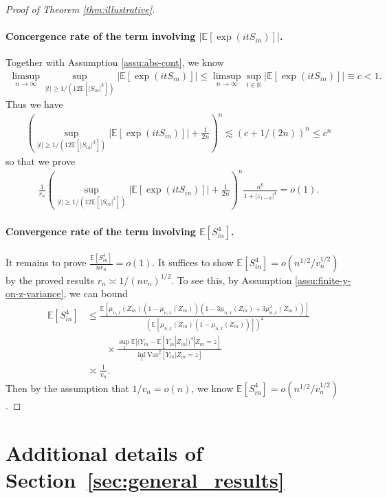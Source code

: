 \documentclass[12pt]{article}
\theoremstyle{definition}
\newcommand{\E}{\mathbb E}								%
\newcommand{\srz}{Z}									%
\newcommand{\sry}{Y}									%
\begin{document}
\begin{proof}[Proof of Theorem \ref{thm:illustrative}]
  \paragraph{Concergence rate of the term involving $|\E[\exp(itS_{in})]|$.} 
  Together with Assumption \ref{assu:abs-cont}, we know
  \begin{align*}
	\limsup_{n\rightarrow\infty}\sup_{|t|\geq 1/ (12\E[|S_{in}|^3])}|\E[\exp(itS_{in})]|\leq \limsup_{n\rightarrow\infty}\sup_{t\in\mathbb{R}}  |\E[\exp(itS_{in})]|\equiv c<1.
  \end{align*} 
  Thus we have 
  \begin{align*}
	\left(\sup_{|t|\geq 1/ (12\E[|S_{in}|^3])}|\E[\exp(itS_{in})]|+\frac{1}{2n}\right)^n\lesssim (c+1/(2n))^n\leq c^n
  \end{align*}
  so that we prove 
  \begin{align*}
	\frac{1}{r_n}\left(\sup_{|t|\geq 1/ (12\E[|S_{in}|^3])}|\E[\exp(itS_{in})]|+\frac{1}{2n}\right)^n\frac{n^6}{1+|z_{1-\alpha}|^4}=o(1).
  \end{align*}

  \paragraph{Convergence rate of the term involving $\E[S_{in}^4]$.}
  It remains to prove $\frac{\E[S_{in}^4]}{nr_n}=o(1)$. It suffices to show $\E[S_{in}^4]=o(n^{1/2}/v_n^{1/2})$ by the proved results $r_n\asymp 1/(nv_n)^{1/2}$. To see this, by Assumption \ref{assu:finite-y-on-z-variance}, we can bound 
  \begin{align*}
	\E[S_{in}^4]
	&
	\leq \frac{\E[\mu_{n,x}(\srz_{in})(1-\mu_{n,x}(\srz_{in}))(1-3\mu_{n,x}(\srz_{in})+3\mu_{n,x}^2(\srz_{in}))]}{(\E[\mu_{n,x}(\srz_{in})(1-\mu_{n,x}(\srz_{in}))])^{2}}\\
	&
	\qquad
	\times \frac{\sup_z\E[(\sry_{in}-\E[\sry_{in}|\srz_{in}])^4|\srz_{in}=z]}{\inf_{z}\mathrm{Var}^2[\sry_{in}|\srz_{in}=z]}\\
	&
	\asymp \frac{1}{v_n}.
  \end{align*}
  Then by the assumption that $1/v_n=o(n)$, we know $\E[S_{in}^4]=o(n^{1/2}/v_n^{1/2})$.
\end{proof}

\section{Additional details of Section~\ref{sec:general_results}}\label{sec:additional-theoretical-results}
\end{document}
